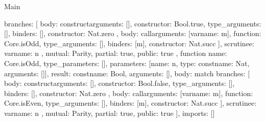 \begin{lexlean}{Main}
\begin{toolingmodule}
{{{        branches: [
          {
            body: construct{arguments: [], constructor: Bool.true, type_arguments: []},
            binders: [],
            constructor: Nat.zero
          },
          {
            body: call{arguments: [var{name: m}], function: Core.isOdd, type_arguments: []},
            binders: [m],
            constructor: Nat.succ
          }
        ],
        scrutinee: var{name: n}
      },
      mutual: Parity,
      partial: true,
      public: true
    },
    function{
      name: Core.isOdd,
      type_parameters: [],
      parameters: [{name: n, type: const{name: Nat, arguments: []}}],
      result: const{name: Bool, arguments: []},
      body: match{
        branches: [
          {
            body: construct{arguments: [], constructor: Bool.false, type_arguments: []},
            binders: [],
            constructor: Nat.zero
          },
          {
            body: call{arguments: [var{name: m}], function: Core.isEven, type_arguments: []},
            binders: [m],
            constructor: Nat.succ
          }
        ],
        scrutinee: var{name: n}
      },
      mutual: Parity,
      partial: true,
      public: true
    }
  ],
  imports: []
}
\end{toolingmodule}
\end{lexlean}

